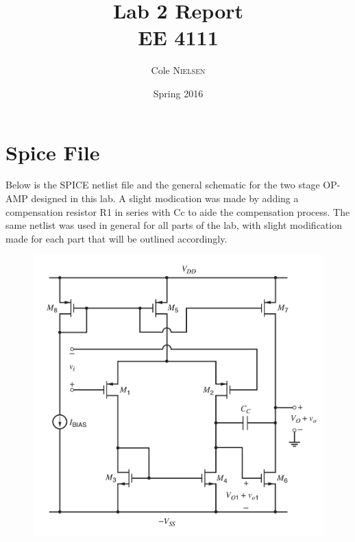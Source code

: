 \documentclass[12pt]{article}
\title{Lab 2 Report\\ \vspace{0.3 in} EE 4111}
\author{Cole \textsc{Nielsen}}
\date{Spring 2016}
\begin{document}
\maketitle 
\pagebreak
\section*{Spice File}
Below is the SPICE netlist file and the general schematic for the two stage OP-AMP designed in this lab. A slight modication was made by adding a compensation resistor R1 in series with Cc to aide the compensation process. The same netlist was used in general for all parts of the lab, with slight modification made for each part that will be outlined accordingly.
\FloatBarrier
\begin{figure}[h!]
\begin{center}
 \includegraphics[scale=0.3]{./schem.png}
\end{center}
\end{figure}
\FloatBarrier
\end{document}
